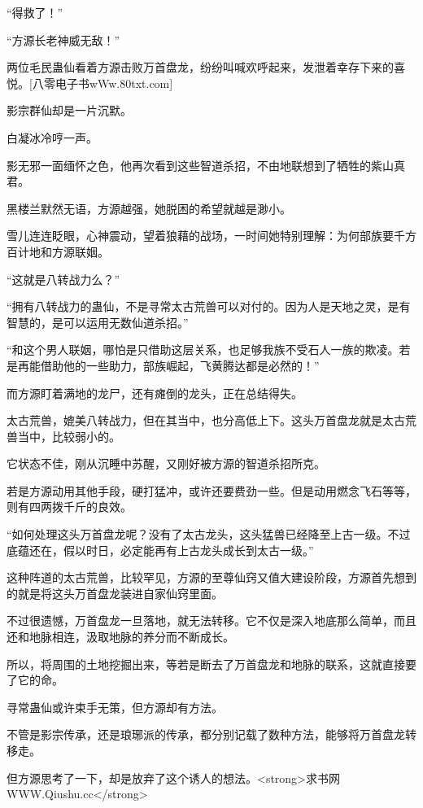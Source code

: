 
\begin{this_body}

“得救了！”

“方源长老神威无敌！”

两位毛民蛊仙看着方源击败万首盘龙，纷纷叫喊欢呼起来，发泄着幸存下来的喜悦。[八零电子书wWw.80txt.com]

影宗群仙却是一片沉默。

白凝冰冷哼一声。

影无邪一面缅怀之色，他再次看到这些智道杀招，不由地联想到了牺牲的紫山真君。

黑楼兰默然无语，方源越强，她脱困的希望就越是渺小。

雪儿连连眨眼，心神震动，望着狼藉的战场，一时间她特别理解：为何部族要千方百计地和方源联姻。

“这就是八转战力么？”

“拥有八转战力的蛊仙，不是寻常太古荒兽可以对付的。因为人是天地之灵，是有智慧的，是可以运用无数仙道杀招。”

“和这个男人联姻，哪怕是只借助这层关系，也足够我族不受石人一族的欺凌。若是再能借助他的一些助力，部族崛起，飞黄腾达都是必然的！”

而方源盯着满地的龙尸，还有瘫倒的龙头，正在总结得失。

太古荒兽，媲美八转战力，但在其当中，也分高低上下。这头万首盘龙就是太古荒兽当中，比较弱小的。

它状态不佳，刚从沉睡中苏醒，又刚好被方源的智道杀招所克。

若是方源动用其他手段，硬打猛冲，或许还要费劲一些。但是动用燃念飞石等等，则有四两拨千斤的良效。

“如何处理这头万首盘龙呢？没有了太古龙头，这头猛兽已经降至上古一级。不过底蕴还在，假以时日，必定能再有上古龙头成长到太古一级。”

这种阵道的太古荒兽，比较罕见，方源的至尊仙窍又值大建设阶段，方源首先想到的就是将这头万首盘龙装进自家仙窍里面。

不过很遗憾，万首盘龙一旦落地，就无法转移。它不仅是深入地底那么简单，而且还和地脉相连，汲取地脉的养分而不断成长。

所以，将周围的土地挖掘出来，等若是断去了万首盘龙和地脉的联系，这就直接要了它的命。

寻常蛊仙或许束手无策，但方源却有方法。

不管是影宗传承，还是琅琊派的传承，都分别记载了数种方法，能够将万首盘龙转移走。

但方源思考了一下，却是放弃了这个诱人的想法。<strong>求书网WWW.Qiushu.cc</strong>


\end{this_body}
